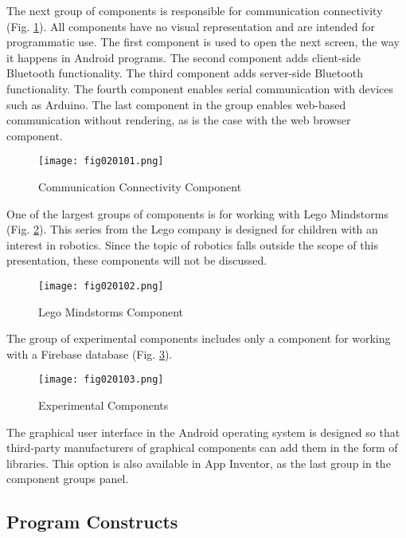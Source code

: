 The next group of components is responsible for communication connectivity (Fig. \ref{fig020101}). All components have no visual representation and are intended for programmatic use. The first component is used to open the next screen, the way it happens in Android programs. The second component adds client-side Bluetooth functionality. The third component adds server-side Bluetooth functionality. The fourth component enables serial communication with devices such as Arduino. The last component in the group enables web-based communication without rendering, as is the case with the web browser component.

\begin{figure}[H]
   \centering
   \texttt{[image: fig020101.png]}
   \caption{Communication Connectivity Component}
\label{fig020101}
\end{figure}

One of the largest groups of components is for working with Lego Mindstorms (Fig. \ref{fig020102}). This series from the Lego company is designed for children with an interest in robotics. Since the topic of robotics falls outside the scope of this presentation, these components will not be discussed.

\begin{figure}[H]
   \centering
   \texttt{[image: fig020102.png]}
   \caption{Lego Mindstorms Component}
\label{fig020102}
\end{figure}

The group of experimental components includes only a component for working with a Firebase database (Fig. \ref{fig020103}).

\begin{figure}[H]
   \centering
   \texttt{[image: fig020103.png]}
   \caption{Experimental Components}
\label{fig020103}
\end{figure}

The graphical user interface in the Android operating system is designed so that third-party manufacturers of graphical components can add them in the form of libraries. This option is also available in App Inventor, as the last group in the component groups panel.

\subsection{Program Constructs}

